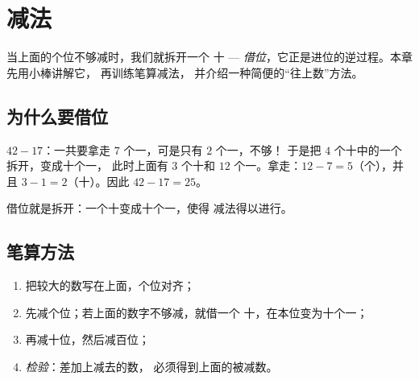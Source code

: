 \chapter{减法}\label{ch:g2:subtraction}

当上面的个位不够减时，我们就拆开一个
十 --- \emph{借位}，它正是进位的逆过程。本章先用小棒讲解它，
再训练笔算减法，
并介绍一种简便的“往上数”方法。

\section{为什么要借位}

\begin{example}[拆开一个十]\label{ex:g2:subtraction:unbundle}
$42 - 17$：一共要拿走 $7$ 个一，可是只有 $2$ 个一，不够！
于是把 $4$ 个十中的一个拆开，变成十个一，
此时上面有 $3$ 个十和 $12$ 个一。拿走：$12 - 7 = 5$（个），并且
$3 - 1 = 2$（十）。因此 $42 - 17 = 25$。
\end{example}

\begin{omfigure}

{\small 借位就是拆开：一个十变成十个一，使得
减法得以进行。}
\end{omfigure}

\section{笔算方法}

\begin{method}[竖式减法]\label{met:g2:subtraction:column}
\begin{enumerate}
  \item 把较大的数写在上面，个位对齐；
  \item 先减个位；若上面的数字不够减，就借一个
        十，在本位变为十个一；
  \item 再减十位，然后减百位；
  \item \emph{检验}：差加上减去的数，
        必须得到上面的被减数。
\end{enumerate}
\end{method}

